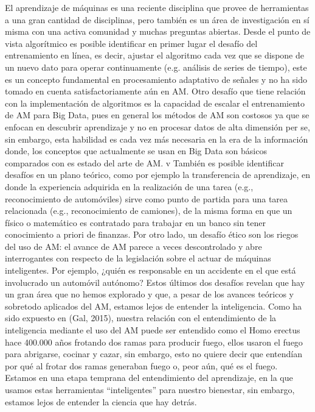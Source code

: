 El aprendizaje de máquinas es una reciente disciplina que provee de herramientas a una gran cantidad de disciplinas, pero también es un área de investigación en sí misma con una activa comunidad y muchas preguntas abiertas. Desde el punto de vista algorítmico es posible identificar en primer lugar el desafío del entrenamiento en línea, es decir, ajustar el algoritmo cada vez que se dispone de un nuevo dato para operar continuamente (e.g. análisis de series de tiempo), este es un concepto fundamental en procesamiento adaptativo de señales y no ha sido tomado en cuenta satisfactoriamente aún en AM. Otro desafío que tiene relación con la implementación de algoritmos es la capacidad de escalar el entrenamiento de AM para Big Data,  pues en general los métodos de AM son costosos ya que se enfocan en descubrir aprendizaje y no en procesar datos de alta dimensión per se, sin embargo, esta habilidad es cada vez más necesaria en la era de la información donde, los conceptos que actualmente se usan en Big Data son básicos comparados con es estado del arte de AM.
  v
También es posible identificar desafíos en un plano teórico, como por ejemplo la transferencia de aprendizaje, en donde la experiencia adquirida en la realización de una tarea (e.g., reconocimiento de automóviles) sirve como punto de partida para una tarea relacionada (e.g., reconocimiento de camiones), de la misma forma en que un físico o matemático es contratado para trabajar en un banco sin tener conocimiento a priori de finanzas. Por otro lado, un desafío ético son los riegos del uso de AM: el avance de AM parece a veces descontrolado y abre interrogantes con respecto de la legislación sobre el actuar de máquinas inteligentes. Por ejemplo, ¿quién es responsable en un accidente en el que está involucrado un automóvil autónomo? Estos últimos dos desafíos revelan que hay un gran área que no hemos explorado y que, a pesar de los avances teóricos y sobretodo aplicados del AM, estamos lejos de entender la inteligencia. Como ha sido expuesto en (Gal, 2015), nuestra relación con el entendimiento de la inteligencia mediante el uso del AM puede ser entendido como el Homo erectus hace 400.000 años frotando dos ramas para producir fuego, ellos usaron el fuego para abrigarse, cocinar y cazar, sin embargo, esto no quiere decir que entendían por qué al frotar dos ramas generaban fuego o, peor aún, qué es el fuego. Estamos en una etapa temprana del entendimiento del aprendizaje, en la que usamos estas herramientas “inteligentes” para nuestro bienestar, sin embargo, estamos lejos de entender la ciencia que hay detrás. 

